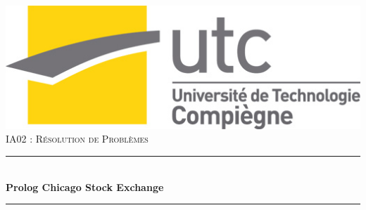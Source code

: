 \documentclass[a4paper, 11pt,twoside, leqno]{report}
\theoremstyle{plain}
\begin{document}
    \begin{titlepage}

\vspace*{1.7cm}
\newcommand{\HRule}{\rule{\linewidth}{0.5mm}} %

\center %


\includegraphics[scale=0.45]{logo_UTC.jpg}\\[2.5cm] %
 
 
\textsc{\Large IA02 : Résolution de Problèmes}\\[0.5cm] %


\HRule \\[1cm]
{ \huge \bfseries Prolog Chicago Stock Exchange}\\[0.4cm] %
\HRule \\[1.5cm]
 

\end{titlepage}
\end{document}
